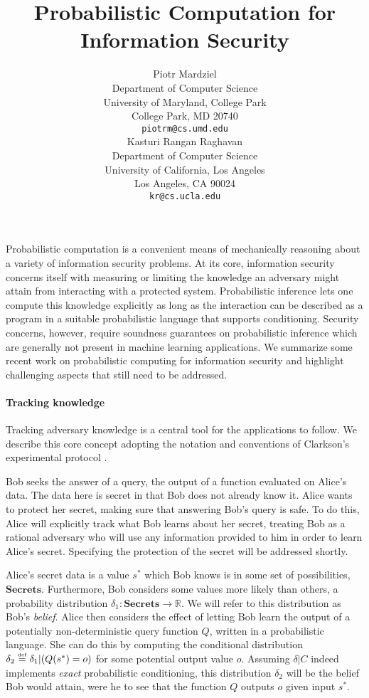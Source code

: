 \documentclass{article} %
\title{Probabilistic Computation for Information Security}
\author{
Piotr Mardziel\\
Department of Computer Science\\
University of Maryland, College Park\\
College Park, MD 20740 \\
\texttt{piotrm@cs.umd.edu} \\
\And
Kasturi Rangan Raghavan\\
Department of Computer Science\\
University of California, Los Angeles\\
Los Angeles, CA 90024\\
\texttt{kr@cs.ucla.edu} \\
}
\newcommand{\ra}{\rightarrow}
\newcommand{\Real}{\mathbb{R}}
\newcommand{\secrets}[0]{\textbf{Secrets}}
\newcommand{\asecret}[0]{s}
\newcommand{\rsecret}[0]{\asecret^*}
\newcommand{\cond}[0]{|}
\newcommand{\stacklabel}[1]{\stackrel{\smash{\scriptscriptstyle \mathrm{#1}}}}
\newcommand{\defeq}{\stacklabel{def}=}
\theoremstyle{plain} %
\theoremstyle{definition} %
\begin{document}
\maketitle

Probabilistic computation is a convenient means of mechanically
reasoning about a variety of information security problems. At its
core, information security concerns itself with measuring or limiting
the knowledge an adversary might attain from interacting with a
protected system. Probabilistic inference lets one compute this
knowledge explicitly as long as the interaction can be described as a
program in a suitable probabilistic language that supports
conditioning. Security concerns, however, require soundness guarantees
on probabilistic inference which are generally not present in machine
learning applications. We summarize some recent work on probabilistic
computing for information security and highlight challenging aspects
that still need to be addressed.

\paragraph*{Tracking knowledge}

Tracking adversary knowledge is a central tool for the applications to
follow. We describe this core concept adopting the notation and
conventions of Clarkson's experimental protocol
\cite{clarkson09quantifying}.

Bob seeks the answer of a query, the output of a function evaluated on Alice's data.
The data here is secret in that Bob does not already know it.
Alice wants to protect her secret, making sure that answering
Bob's query is safe.
To do this, Alice will explicitly track what Bob
learns about her secret, treating Bob as a rational adversary
who will use any information provided to him in order to learn Alice's
secret. Specifying the protection of the secret will be addressed shortly.

Alice's secret data is a value $ \rsecret $ which Bob knows is in some
set of possibilities, $ \secrets $. Furthermore, Bob considers some
values more likely than others, a probability distribution $ \delta_1
: \secrets \ra \Real $. We will refer to this distribution as Bob's
\emph{belief}. Alice then considers the effect of letting Bob learn
the output of a potentially non-deterministic query function $ Q $, written
in a probabilistic language. She can do this by computing the
conditional distribution $ \delta_2 \defeq \delta_1 \cond (Q(\rsecret)
= o) $ for some potential output value $ o $. Assuming $ \delta | C $
indeed implements \emph{exact} probabilistic conditioning, this
distribution $ \delta_2 $ will be the belief Bob would attain, were he
to see that the function $ Q $ outputs $ o $ given input $ \rsecret $.
\end{document}
